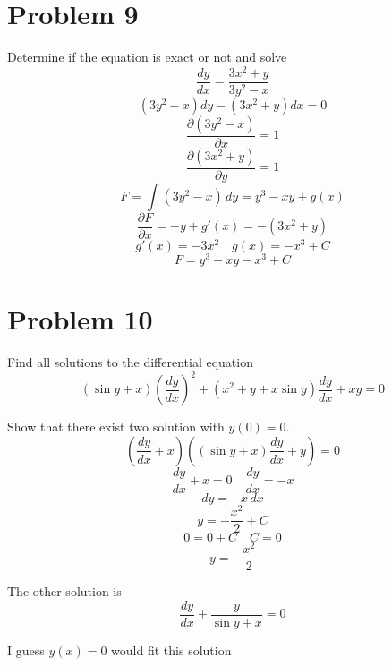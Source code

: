 \documentclass[hidelinks]{article}
\begin{document}
\section*{Problem 9}
Determine if the equation is exact or not and solve
\[
    \frac{dy}{dx} = \frac{3x^2+y}{3y^2-x}
\]
\[
    (3y^2 - x)dy - (3x^2 + y)dx = 0
\]
\[
    \frac{\partial (3y^2 - x)}{\partial x} = 1
\]
\[
    \frac{\partial (3x^2 + y)}{\partial y} = 1
\]
\[
    F = \int (3y^2 - x) \, dy = y^3 - xy + g(x)
\]
\[
    \frac{\partial F}{\partial x} = -y + g'(x) = -(3x^2 + y)
\]
\[
    g'(x) = -3x^2 \quad g(x) = -x^3 + C
\]
\[
    F = y^3 - xy - x^3 + C
\]
\newpage
\section*{Problem 10}

Find all solutions to the differential equation
$$
(\sin y+x)\left(\frac{d y}{d x}\right)^2+\left(x^2+y+x \sin y\right) \frac{d y}{d x}+x y=0
$$

Show that there exist two solution with $y(0)=0$.
\[
    (\frac{dy}{dx} + x)((\sin y + x)\frac{dy}{dx} + y) = 0
\]
\[
    \frac{dy}{dx} + x = 0 \quad \frac{dy}{dx} = -x
\]
\[
    dy = -x \, dx 
\]
\[
    y = -\frac{x^2}{2} + C
\]
\[
    0 = 0 + C \quad C = 0 
\]
\[
    y = -\frac{x^2}{2}
\]

The other solution is
\[
    \frac{dy}{dx} + \frac{y}{\sin y + x} = 0
\]

I guess $y(x) = 0$ would fit this solution 
\end{document}
